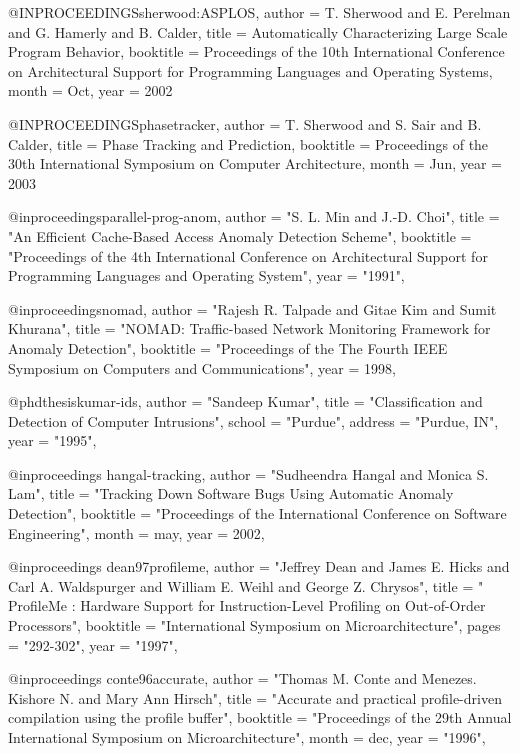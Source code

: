 @INPROCEEDINGS{sherwood:ASPLOS,
           author = {T. Sherwood and E. Perelman and G. Hamerly and B. Calder},
           title = {Automatically Characterizing Large Scale Program Behavior},
           booktitle = {Proceedings of the 10th International
                  Conference on Architectural Support for Programming
                  Languages and Operating Systems},
           month = Oct,
           year = 2002
}

@INPROCEEDINGS{phasetracker,
           author = {T. Sherwood and S. Sair and B. Calder},
           title = {Phase Tracking and Prediction},
           booktitle = {Proceedings of the 30th International
                  Symposium on Computer Architecture},
           month = Jun,
           year = 2003
}


@inproceedings{parallel-prog-anom,
    author = "S. L. Min and J.-D. Choi",
    title = "An Efficient Cache-Based Access Anomaly Detection Scheme",
    booktitle = "Proceedings of the 4th International 
	Conference on Architectural Support for Programming Languages and Operating System",
    year = "1991",
}


@inproceedings{nomad,
  author =       "Rajesh R. Talpade and Gitae Kim and Sumit Khurana",
  title =        "NOMAD: Traffic-based Network Monitoring Framework for Anomaly Detection",
  booktitle =      "Proceedings of the The Fourth IEEE Symposium on Computers and Communications",
  year =         1998,
}

@phdthesis{kumar-ids,
    author = "Sandeep Kumar",
    title = "Classification and Detection of Computer Intrusions",
    school = "Purdue",
    address = "Purdue, IN",
    year = "1995",
}

@inproceedings{ hangal-tracking,
  author = "Sudheendra Hangal and Monica S. Lam",
  title = "Tracking Down Software Bugs Using Automatic Anomaly Detection",
  booktitle = "Proceedings of the International Conference on Software Engineering",
  month = may, 
  year = 2002,
}


@inproceedings{ dean97profileme,
    author = "Jeffrey Dean and James E. Hicks and Carl A. Waldspurger and William E. Weihl and George Z. Chrysos",
    title = " ProfileMe : Hardware Support for Instruction-Level Profiling on Out-of-Order Processors",
    booktitle = "International Symposium on Microarchitecture",
    pages = "292-302",
    year = "1997",
}

@inproceedings{ conte96accurate,
    author = "Thomas M. Conte and Menezes. Kishore N. and Mary Ann Hirsch",
    title = "Accurate and practical profile-driven compilation using the profile buffer",
    booktitle = "Proceedings of the 29th Annual International Symposium on Microarchitecture",
    month = dec,
    year = "1996",
}

